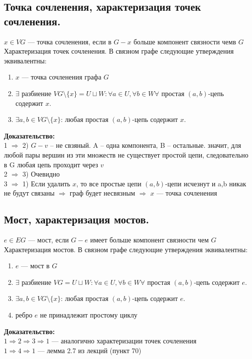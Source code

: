 \documentclass[12pt]{article}
\begin{document}
\subsection{Точка сочленения, характеризация точек сочленения.}
	$x \in VG$ — точка сочленения, если в $G - x$ больше компонент связности чемв $G$\\
	Характеризация точек сочленения. В связном графе следующие утверждения эквивалентны:
	\begin{enumerate}
		\item $x$ — точка сочленения графа $G$
		\item $\exists$ разбиение $VG \setminus \{x\} = U \sqcup W: \forall a \in U, \forall b \in W \forall$ простая $(a,b)$-цепь содержит $x$.
		\item $\exists a,b \in VG \setminus \{x\}$: любая простая $(a,b)$-цепь содержит $x$.
	\end{enumerate}
	\textbf{Доказательство:}\\
		1 $\Rightarrow$ 2) $G - v$ – не свзяный. A – одна компонента, B – остальные. значит, для любой пары вершин из эти множеств
не существует простой цепи, следовательно в G любая цепь проходит через $v$\\
		2 $\Rightarrow$ 3) Очевидно\\
		3 $\Rightarrow$ 1) Если удалить $x$, то все простые цепи $(a,b)$-цепи исчезнут и a,b никак не будут связаны $\Rightarrow$ граф будет несвязным $\Rightarrow$ $x$ — точка сочленения\\
	\qedsymbol
\subsection{Мост, характеризация мостов.}
	$e \in EG$ — мост, если $G-e$ имеет больше компонент связности чем $G$\\
	Характеризация мостов. В связном графе следующие утверждения эквивалентны:\\
		\begin{enumerate}
		\item $e$ — мост в $G$
		\item $\exists$ разбиение $VG = U \sqcup W: \forall a \in U, \forall b \in W \forall$ простая $(a,b)$-цепь содержит $e$.
		\item $\exists a,b \in VG \setminus \{x\}$: любая простая $(a,b)$-цепь содержит $e$.
		\item ребро $e$ не принадлежит простому циклу
	\end{enumerate}
	\textbf{Доказательство:}\\
		$1 \Rightarrow2\Rightarrow3\Rightarrow1$ — аналогично характеризации точек сочленения\\
		$1\Rightarrow4\Rightarrow1$ — лемма 2.7 из лекций (пункт 70)\\
	\qedsymbol
\end{document}
